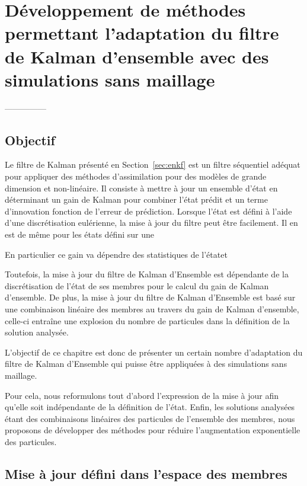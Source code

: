 
\section{Développement de méthodes permettant l'adaptation du filtre de Kalman d'ensemble avec des simulations sans maillage}

---------------
\subsection{Objectif}
Le filtre de Kalman présenté en Section~\ref*{sec:enkf} est un filtre séquentiel adéquat pour appliquer des méthodes d'assimilation pour des modèles de grande dimension et non-linéaire. Il consiste à mettre à jour un ensemble d'état en déterminant un gain de Kalman pour combiner l'état prédit et un terme d'innovation fonction de l'erreur de prédiction. Lorsque l'état est défini à l'aide d'une discrétisation eulérienne, la mise à jour du filtre peut être facilement. Il en est de même pour les états défini sur une

%
%

En particulier ce gain va dépendre des statistiques de l'étatet

Toutefois, la mise à jour du filtre de Kalman d'Ensemble est dépendante de la discrétisation de l'état de ses membres pour le calcul du gain de Kalman d'ensemble. De plus, la mise à jour du filtre de Kalman d'Ensemble est basé sur une combinaison linéaire des membres au travers du gain de Kalman d'ensemble, celle-ci entraîne une explosion du nombre de particules dans la définition de la solution analysée.

L'objectif de ce chapitre est donc de présenter un certain nombre d'adaptation du filtre de Kalman d'Ensemble qui puisse être appliquées à des simulations sans maillage.

Pour cela, nous reformulons tout d'abord l'expression de la mise à jour afin qu'elle soit indépendante de la définition de l'état.
Enfin, les solutions analysées étant des combinaisons linéaires des particules de l'ensemble des membres, nous proposons de développer des méthodes pour réduire l'augmentation exponentielle des particules.

\subsection{Mise à jour défini dans l'espace des membres}

